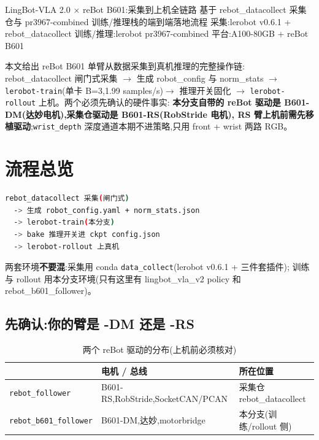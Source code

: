 \documentclass[11pt]{ctexart}
\begin{document}
{LingBot-VLA 2.0 × reBot B601:采集到上机全链路}
{基于 rebot\_datacollect 采集仓与 pr3967-combined 训练/推理栈的端到端落地流程}
{采集:lerobot v0.6.1 + rebot\_datacollect \quad 训练/推理:lerobot pr3967-combined \quad 平台:A100-80GB + reBot B601}

\begin{cnabstract}
本文给出 reBot B601 单臂从数据采集到真机推理的完整操作链:
rebot\_datacollect 闸门式采集 $\to$ 生成 robot\_config 与 norm\_stats $\to$
\texttt{lerobot-train}(单卡 B=3,1.99 samples/s)$\to$ 推理开关固化 $\to$
\texttt{lerobot-rollout} 上机。两个必须先确认的硬件事实:
\textbf{本分支自带的 reBot 驱动是 B601-DM(达妙电机),采集仓驱动是 B601-RS(RobStride 电机),
RS 臂上机前需先移植驱动};\texttt{wrist\_depth} 深度通道本期不进策略,只用 front + wrist 两路 RGB。
\end{cnabstract}

\section{流程总览}
\begin{lstlisting}[language=bash,caption={全链路五步}]
rebot_datacollect 采集(闸门式)
  -> 生成 robot_config.yaml + norm_stats.json
  -> lerobot-train(本分支)
  -> bake 推理开关进 ckpt config.json
  -> lerobot-rollout 上真机
\end{lstlisting}

两套环境\textbf{不要混}:采集用 conda \texttt{data\_collect}(lerobot v0.6.1 + 三件套插件);
训练与 rollout 用本分支环境(只有这里有 lingbot\_vla\_v2 policy 和 rebot\_b601\_follower)。

\subsection{先确认:你的臂是 -DM 还是 -RS}
\begin{table}[htbp]
\centering\small
\caption{两个 reBot 驱动的分布(上机前必须核对)}
\begin{tabular}{@{}lll@{}}
\toprule
 & 电机 / 总线 & 所在位置 \\
\midrule
\texttt{rebot\_follower} & B601-RS,RobStride,SocketCAN/PCAN & 采集仓 rebot\_datacollect \\
\texttt{rebot\_b601\_follower} & B601-DM,达妙,motorbridge & 本分支(训练/rollout 侧) \\
\bottomrule
\end{tabular}
\end{table}
\end{document}
